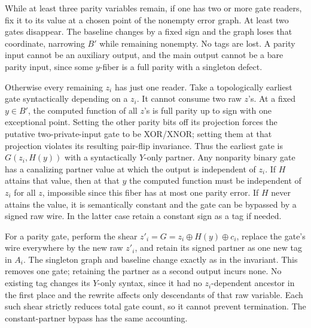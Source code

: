 \documentclass[11pt]{article}
\begin{document}
While at least three parity variables remain, if one has two or more gate readers, fix it to its value at a chosen point of the nonempty error graph. At least two gates disappear. The baseline changes by a fixed sign and the graph loses that coordinate, narrowing \(B'\) while remaining nonempty. No tags are lost. A parity input cannot be an auxiliary output, and the main output cannot be a bare parity input, since some \(y\)-fiber is a full parity with a singleton defect.

Otherwise every remaining \(z_i\) has just one reader. Take a topologically earliest gate syntactically depending on a \(z_i\). It cannot consume two raw \(z\)'s. At a fixed \(y\in B'\), the computed function of all \(z\)'s is full parity up to sign with one exceptional point. Setting the other parity bits off its projection forces the putative two-private-input gate to be XOR/XNOR; setting them at that projection violates its resulting pair-flip invariance. Thus the earliest gate is \(G(z_i,H(y))\) with a syntactically \(Y\)-only partner. Any nonparity binary gate has a canalizing partner value at which the output is independent of \(z_i\). If \(H\) attains that value, then at that \(y\) the computed function must be independent of \(z_i\) for all \(z\), impossible since this fiber has at most one parity error. If \(H\) never attains the value, it is semantically constant and the gate can be bypassed by a signed raw wire. In the latter case retain a constant sign as a tag if needed.

For a parity gate, perform the shear \(z'_i=G=z_i\oplus H(y)\oplus c_i\), replace the gate's wire everywhere by the new raw \(z'_i\), and retain its signed partner as one new tag in \(A_i\). The singleton graph and baseline change exactly as in the invariant. This removes one gate; retaining the partner as a second output incurs none. No existing tag changes its \(Y\)-only syntax, since it had no \(z_i\)-dependent ancestor in the first place and the rewrite affects only descendants of that raw variable. Each such shear strictly reduces total gate count, so it cannot prevent termination. The constant-partner bypass has the same accounting.
\end{document}
